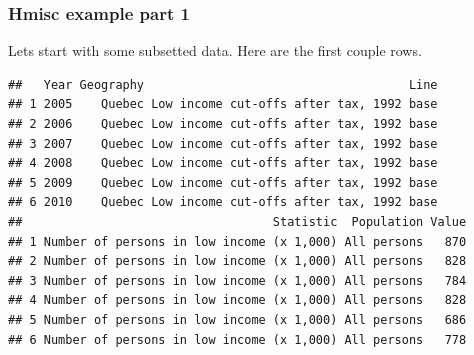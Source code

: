 \documentclass[nogin]{beamer}\usepackage[]{graphicx}\usepackage[]{color}
\makeatletter
\newenvironment{kframe}{%
 \def\at@end@of@kframe{}%
 \ifinner\ifhmode%
  \def\at@end@of@kframe{\end{minipage}}%
  \begin{minipage}{\columnwidth}%
 \fi\fi%
 \def\FrameCommand##1{\hskip\@totalleftmargin \hskip-\fboxsep
 \colorbox{shadecolor}{##1}\hskip-\fboxsep
     \hskip-\linewidth \hskip-\@totalleftmargin \hskip\columnwidth}%
 \MakeFramed {\advance\hsize-\width
   \@totalleftmargin\z@ \linewidth\hsize
   \@setminipage}}%
 {\par\unskip\endMakeFramed%
 \at@end@of@kframe}
\newenvironment{knitrout}{}{} %
\makeatother
\begin{document}
\begin{frame}[fragile]
\frametitle{Hmisc example part 1}
\small
Lets start with some subsetted data. Here are the first couple rows.
\begin{knitrout}\tiny
{}\color{fgcolor}\begin{kframe}
\begin{verbatim}
##   Year Geography                                     Line
## 1 2005    Quebec Low income cut-offs after tax, 1992 base
## 2 2006    Quebec Low income cut-offs after tax, 1992 base
## 3 2007    Quebec Low income cut-offs after tax, 1992 base
## 4 2008    Quebec Low income cut-offs after tax, 1992 base
## 5 2009    Quebec Low income cut-offs after tax, 1992 base
## 6 2010    Quebec Low income cut-offs after tax, 1992 base
##                                   Statistic  Population Value
## 1 Number of persons in low income (x 1,000) All persons   870
## 2 Number of persons in low income (x 1,000) All persons   828
## 3 Number of persons in low income (x 1,000) All persons   784
## 4 Number of persons in low income (x 1,000) All persons   828
## 5 Number of persons in low income (x 1,000) All persons   686
## 6 Number of persons in low income (x 1,000) All persons   778
\end{verbatim}
\end{kframe}
\end{knitrout}

\end{frame}
\end{document}
